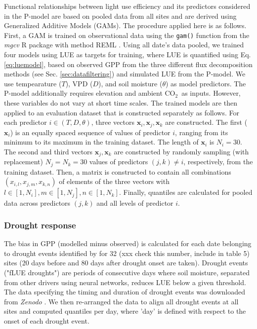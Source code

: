 \documentclass{myreport}
\newcommand{\coo}{CO$_2$}
\begin{document}
Functional relationships between light use efficiency and its predictors considered in the P-model are based on pooled data from all sites and are derived using Generalized Additive Models (GAMs). The procedure applied here is as follows. First, a GAM is trained on observational data using the \texttt{gam()} function from the \textit{mgcv} R package with method REML \citep{mgcv}. Using all date's data pooled, we trained four models using LUE as targets for training, where LUE is quantified using Eq. \ref{eq:luemodel}, based on observed GPP from the three different flux decomposition methods (see Sec. \ref{sec:datafiltering}) and simulated LUE from the P-model. We use tempearature ($T$), VPD ($D$), and soil moisture ($\theta$) as model predictors. The P-model additionally requires elevation and ambient \coo\ as inputs. However, these variables do not vary at short time scales. The trained models are then applied to an evaluation dataset that is constructed separately as follows. For each predictor $i \in (T, D, \theta)$, three vectors $\mathbf{x}_i, \mathbf{x}_j, \mathbf{x}_k$ are constructed. The first ($\mathbf{x}_i$) is an equally spaced sequence of values of predictor $i$, ranging from its minimum to its maximum in the training dataset. The length of $\mathbf{x}_i$ is $N_i=30$. The second and third vectors $\mathbf{x}_j, \mathbf{x}_k$ are constructed by randomly sampling (with replacement) $N_j=N_k=30$ values of predictors $(j,k)\neq i$, respectively, from the training dataset. Then, a matrix is constructed to contain all combinations $(x_{i,l}, x_{j,m}, x_{k,n})$ of elements of the three vectors with $l \in [1,N_i], m \in [1,N_j], n \in [1,N_k]$. Finally, quantiles are calculated for pooled data across predictors $(j,k)$ and all levels of predictor $i$.

\subsubsection{Drought response}
\label{sec:droughtresponse}
The bias in GPP (modelled minus observed) is calculated for each date belonging to drought events identified by \cite{stocker18newphyt} for 32 (xxx check this number, include in table 5) sites (20 days before and 80 days after drought onset are taken). Drought events ("fLUE droughts") are periods of consecutive days where soil moisture, separated from other drivers using neural networks, reduces LUE below a given threshold. The data specifying the timing and duration of drought events was downloaded from \textit{Zenodo} \citep{flue}. We then re-arranged the data to align all drought events at all sites and computed quantiles per day, where 'day' is defined with respect to the onset of each drought event. 
\end{document}
